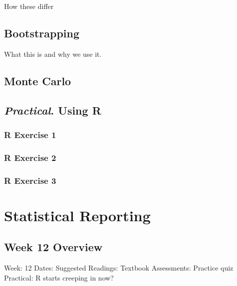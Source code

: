 \documentclass[
]{scrbook}
\begin{document}
How these differ

\hypertarget{bootstrapping}{%
\chapter{Bootstrapping}\label{bootstrapping}}

What this is and why we use it.

\hypertarget{monte-carlo}{%
\chapter{Monte Carlo}\label{monte-carlo}}

\hypertarget{practical.-using-r}{%
\chapter{\texorpdfstring{\emph{Practical}. Using R}{Practical. Using R}}\label{practical.-using-r}}

\hypertarget{r-exercise-1}{%
\section{R Exercise 1}\label{r-exercise-1}}

\hypertarget{r-exercise-2}{%
\section{R Exercise 2}\label{r-exercise-2}}

\hypertarget{r-exercise-3}{%
\section{R Exercise 3}\label{r-exercise-3}}

\hypertarget{part-statistical-reporting}{%
\part{Statistical Reporting}\label{part-statistical-reporting}}

\hypertarget{Week12}{%
\chapter*{Week 12 Overview}\label{Week12}}

Week: 12
Dates:
Suggested Readings: Textbook
Assessments: Practice quiz
Practical: R starts creeping in now?
\end{document}

